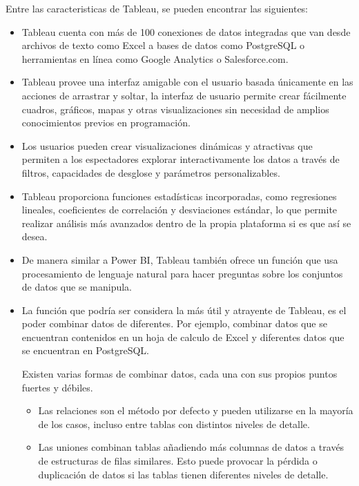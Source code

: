 Entre las caracteristicas de Tableau, se pueden encontrar las siguientes:
\begin{itemize}
    \item Tableau cuenta con más de 100 conexiones de datos integradas que van desde archivos de texto como Excel a bases de datos como PostgreSQL o herramientas en línea como Google Analytics o Salesforce.com.

    \item Tableau provee una interfaz amigable con el usuario basada únicamente en las acciones de arrastrar y soltar, la interfaz de usuario permite crear fácilmente cuadros, gráficos, mapas y otras visualizaciones sin necesidad de amplios conocimientos previos en programación.

    \item Los usuarios pueden crear visualizaciones dinámicas y atractivas que permiten a los espectadores explorar interactivamente los datos a través de filtros, capacidades de desglose y parámetros personalizables.

    \item Tableau proporciona funciones estadísticas incorporadas, como regresiones lineales, coeficientes de correlación y desviaciones estándar, lo que permite realizar análisis más avanzados dentro de la propia plataforma si es que así se desea.

    \item De manera similar a Power BI, Tableau también ofrece un función que usa procesamiento de lenguaje natural para hacer preguntas sobre los conjuntos de datos que se manipula.

    \item La función que podría ser considera la más útil y atrayente de Tableau, es el poder combinar datos de diferentes. Por ejemplo, combinar datos que se encuentran contenidos en un hoja de calculo de Excel y diferentes datos que se encuentran en PostgreSQL.

    Existen varias formas de combinar datos, cada una con sus propios puntos fuertes y débiles.

    \begin{itemize}
        \item Las relaciones son el método por defecto y pueden utilizarse en la mayoría de los casos, incluso entre tablas con distintos niveles de detalle.

        \item Las uniones combinan tablas añadiendo más columnas de datos a través de estructuras de filas similares. Esto puede provocar la pérdida o duplicación de datos si las tablas tienen diferentes niveles de detalle.


\end{itemize}
\end{itemize}
